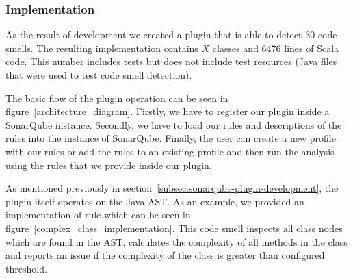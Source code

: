 
\subsubsection{Implementation}\label{subsec:implementation}



As the result of development we created a plugin that is able to detect 30 code smells.
The resulting implementation contains $X$ classes and 6476 lines of Scala code.
This number includes tests but does not include test resources (Java files that were
used to test code smell detection).


The basic flow of the plugin operation can be seen in figure~\ref{architecture_diagram}.
Firstly, we have to register our plugin inside a SonarQube instance.
Secondly, we have to load our rules and descriptions of the rules into the instance of SonarQube.
Finally, the user can create a new profile with our rules or add the rules to an existing
profile and then run the analysis using the rules that we provide inside our plugin.

As mentioned previously in section~\ref{subsec:sonarqube-plugin-development}, the plugin itself operates on the Java
AST\@.
As an example, we provided an implementation of  rule which can be seen in figure~\ref{complex_class_implementation}.
This code smell inspects all class nodes which are found in the AST, calculates the complexity of all methods
in the class and reports an issue if the complexity of the class is greater than configured threshold.

